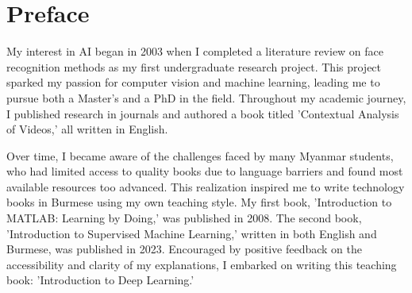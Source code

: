 \chapter*{Preface}

%

My interest in AI began in 2003 when I completed a literature review on face recognition methods as my first undergraduate research project. This project sparked my passion for computer vision and machine learning, leading me to pursue both a Master's and a PhD in the field. Throughout my academic journey, I published research in journals and authored a book titled 'Contextual Analysis of Videos,' all written in English.

Over time, I became aware of the challenges faced by many Myanmar students, who had limited access to quality books due to language barriers and found most available resources too advanced. This realization inspired me to write technology books in Burmese using my own teaching style. My first book, 'Introduction to MATLAB: Learning by Doing,' was published in 2008. The second book, 'Introduction to Supervised Machine Learning,' written in both English and Burmese, was published in 2023. Encouraged by positive feedback on the accessibility and clarity of my explanations, I embarked on writing this teaching book: 'Introduction to Deep Learning.'

